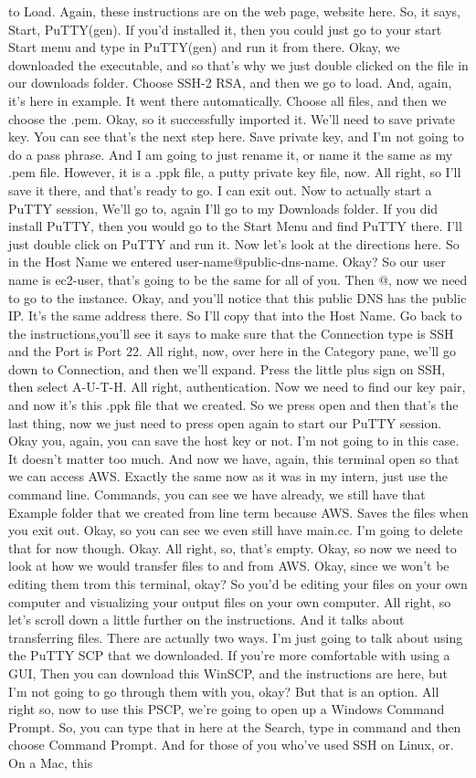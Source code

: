 \documentclass[10pt]{article}
\begin{document}
to Load. Again, these instructions are on the web page, website here. So, it says, Start, PuTTY(gen). If you'd installed it, then you could just go to your start Start menu and type in PuTTY(gen) and run it from there. Okay, we downloaded the executable, and so that's why we just double clicked on the file in our downloads folder. Choose SSH-2 RSA, and then we go to load. And, again, it's here in example. It went there automatically. Choose all files, and then we choose the .pem. Okay, so it successfully imported it. We'll need to save private key. You can see that's the next step here. Save private key, and I'm not going to do a pass phrase. And I am going to just rename it, or name it the same as my .pem file. However, it is a .ppk file, a putty private key file, now. All right, so I'll save it there, and that's ready to go. I can exit out. Now to actually start a PuTTY session, We'll go to, again I'll go to my Downloads folder. If you did install PuTTY, then you would go to the Start Menu and find PuTTY there. I'll just double click on PuTTY and run it. Now let's look at the directions here. So in the Host Name we entered user-name@public-dns-name. Okay? So our user name is ec2-user, that's going to be the same for all of you. Then @, now we need to go to the instance. Okay, and you'll notice that this public DNS has the public IP. It's the same address there. So I'll copy that into the Host Name. Go back to the instructions,you'll see it says to make sure that the Connection type is SSH and the Port is Port 22. All right, now, over here in the Category pane, we'll go down to Connection, and then we'll expand. Press the little plus sign on SSH, then select A-U-T-H. All right, authentication. Now we need to find our key pair, and now it's this .ppk file that we created. So we press open and then that's the last thing, now we just need to press open again to start our PuTTY session. Okay you, again, you can save the host key or not. I'm not going to in this case. It doesn't matter too much. And now we have, again, this terminal open so that we can access AWS. Exactly the same now as it was in my intern, just use the command line. Commands, you can see we have already, we still have that Example folder that we created from line term because AWS. Saves the files when you exit out. Okay, so you can see we even still have main.cc. I'm going to delete that for now though. Okay. All right, so, that's empty. Okay, so now we need to look at how we would transfer files to and from AWS. Okay, since we won't be editing them trom this terminal, okay? So you'd be editing your files on your own computer and visualizing your output files on your own computer. All right, so let's scroll down a little further on the instructions. And it talks about transferring files. There are actually two ways. I'm just going to talk about using the PuTTY SCP that we downloaded. If you're more comfortable with using a GUI, Then you can download this WinSCP, and the instructions are here, but I'm not going to go through them with you, okay? But that is an option. All right so, now to use this PSCP, we're going to open up a Windows Command Prompt. So, you can type that in here at the Search, type in command and then choose Command Prompt. And for those of you who've used SSH on Linux, or. On a Mac, this 
\end{document}
